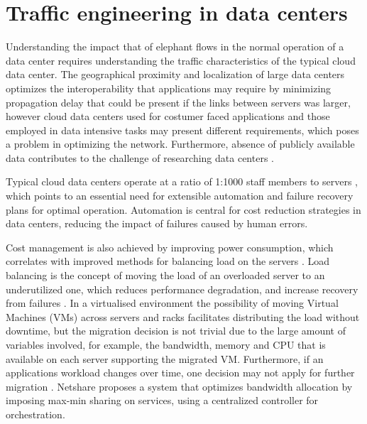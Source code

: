 \section {Traffic engineering in data centers}

Understanding the impact that of elephant flows in the normal operation of a data center requires understanding the traffic characteristics of the typical cloud 
data center. The geographical proximity and localization of large data centers optimizes the interoperability that applications may require by minimizing 
propagation delay that could be present if the links between servers was larger, however cloud data centers used for costumer faced applications and those employed
in data intensive tasks may present different requirements, which poses a problem in optimizing the network. Furthermore, absence of publicly available data
contributes to the challenge of researching data centers \cite{CITE - network_traffic_characteristics_wild.pdf}.

\par Typical cloud data centers operate at a ratio of 1:1000 staff members to servers \cite{CITE - cloud_dc_research_problems}, which points to an essential need for 
extensible automation and failure recovery plans for optimal operation. Automation is central for cost reduction strategies in data centers, reducing the 
impact of failures caused by human errors.

\par Cost management is also achieved by improving power consumption, which correlates with improved methods for balancing load on the servers 
\cite{CITE - performance_optimization_virtual_machine_placement}. Load balancing is the concept of moving the load of an overloaded server to an underutilized one,
which reduces performance degradation, and increase recovery from failures \cite{CITE - server_storage_virtualization}. In a virtualised environment the possibility
of moving Virtual Machines (VMs) across servers and racks facilitates distributing the load without downtime, but the migration decision is not trivial due to the
large amount of variables involved, for example, the bandwidth, memory and CPU that is available on each server supporting the migrated VM. Furthermore, if an
applications workload changes over time, one decision may not apply for further migration \cite{CITE - multi_objective_vm_cloud_dc}. Netshare
\cite{CITE - netshare_predictable_bw_allocation.pdf} proposes a system that optimizes bandwidth allocation by imposing max-min sharing on services, using a 
centralized controller for orchestration. 


